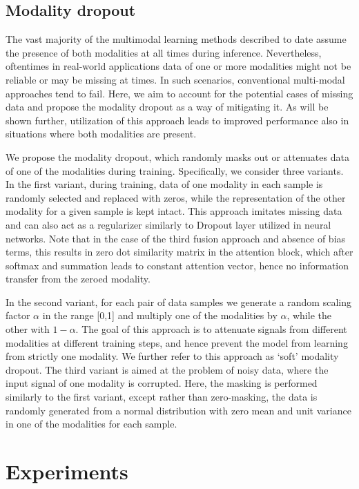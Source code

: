 \documentclass[a4paper,conference]{IEEEtran}
\begin{document}
\subsection{Modality dropout}
The vast majority of the multimodal learning methods described to date assume the presence of both modalities at all times during inference. Nevertheless, oftentimes in real-world applications data of one or more modalities might not be reliable or may be missing at times. In such scenarios, conventional multi-modal approaches tend to fail. Here, we aim to account for the potential cases of missing data and propose the modality dropout as a way of mitigating it. As will be shown further, utilization of this approach leads to improved performance also in situations where both modalities are present. 

We propose the modality dropout, which randomly masks out or attenuates data of one of the modalities during training. Specifically, we consider three variants. In the first variant, during training, data of one modality in each sample is randomly selected and replaced with zeros, while the representation of the other modality for a given sample is kept intact. This approach imitates missing data and can also act as a regularizer similarly to Dropout layer utilized in neural networks. Note that in the case of the third fusion approach and absence of bias terms, this results in zero dot similarity matrix in the attention block, which after softmax and summation leads to constant attention vector, hence no information transfer from the zeroed modality. 

In the second variant, for each pair of data samples we generate a random scaling factor $\alpha$ in the range [0,1] \cite{shen2017continuous} and multiply one of the modalities by $\alpha$, while the other with $1 - \alpha$. The goal of this approach is to attenuate signals from different modalities at different training steps, and hence prevent the model from learning from strictly one modality. We further refer to this approach as `soft' modality dropout. The third variant is aimed at the problem of noisy data, where the input signal of one modality is corrupted. Here, the masking is performed similarly to the first variant, except rather than zero-masking, the data is randomly generated from a normal distribution with zero mean and unit variance in one of the modalities for each sample.

\section{Experiments}
\end{document}

